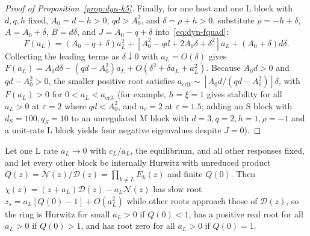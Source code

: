 \begin{proof}[Proof of Proposition~{\upshape\ref{prop:dyn-k5}}]
Finally, for one host and one L block with $d, q, h$ fixed, $A_0 = d - h > 0$, $qd > A_0^2$, and $\delta = \rho + h > 0$, substitute $\rho = -h + \delta$, $A = A_0 + \delta$, $B = d\delta$, and $J = A_0 - q + \delta$ into~\eqref{eq:dyn-fquad}:
\[
F(a_L) = (A_0 - q + \delta)a_L^2 + [A_0^2 - qd + 2A_0\delta + \delta^2]a_L + (A_0 + \delta)d\delta.
\]
Collecting the leading terms as $\delta \downarrow 0$ with $a_L = O(\delta)$ gives $F(a_L) = A_0 d\delta - (qd - A_0^2)a_L + O(\delta^2 + \delta a_L + a_L^2)$. Because $A_0 d > 0$ and $qd - A_0^2 > 0$, the smaller positive root satisfies $a_{\mathrm{crit}} \sim [A_0 d/(qd - A_0^2)]\delta$, with $F(a_L) > 0$ for $0 < a_L < a_{\mathrm{crit}}$ (for example, $h = \xi = 1$ gives stability for all $a_L > 0$ at $\varepsilon = 2$ where $qd < A_0^2$, and $a_c = 2$ at $\varepsilon = 1.5$; adding an S block with $d_S = 100, q_S = 10$ to an unregulated M block with $d = 3, q = 2, h = 1, \rho = -1$ and a unit-rate L block yields four negative eigenvalues despite $J = 0$).
\end{proof}

\begin{proposition}\label{prop:dyn-k6}
Let one L rate $a_L \to 0$ with $c_L/a_L$, the equilibrium, and all other responses fixed, and let every other block be internally Hurwitz with unreduced product $Q(z) = \mathcal{N}(z)/\mathcal{D}(z) = \prod_{k \ne L} E_k(z)$ and finite $Q(0)$. Then $\chi(z) = (z + a_L)\mathcal{D}(z) - a_L\mathcal{N}(z)$ has slow root $z_s = a_L[Q(0) - 1] + O(a_L^2)$ while other roots approach those of $\mathcal{D}(z)$, so the ring is Hurwitz for small $a_L > 0$ if $Q(0) < 1$, has a positive real root for all $a_L > 0$ if $Q(0) > 1$, and has root zero for all $a_L > 0$ if $Q(0) = 1$.
\end{proposition}

